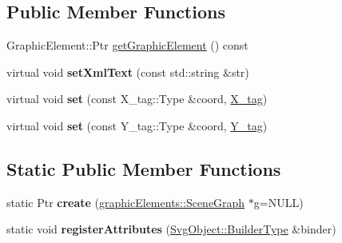 \subsection*{Public Member Functions}
\begin{DoxyCompactItemize}
\item 
GraphicElement::Ptr \hyperlink{classsambag_1_1disco_1_1svg_1_1_svg_text_aa1f3ca78615ca97b0c3883584104683b}{getGraphicElement} () const 
\item 
\hypertarget{classsambag_1_1disco_1_1svg_1_1_svg_text_a51de673f772b87db82987130a113acbf}{
virtual void {\bfseries setXmlText} (const std::string \&str)}
\label{classsambag_1_1disco_1_1svg_1_1_svg_text_a51de673f772b87db82987130a113acbf}

\item 
\hypertarget{classsambag_1_1disco_1_1svg_1_1_svg_text_a5b9a2141048f6ce528dde97ce93e77cb}{
virtual void {\bfseries set} (const X\_\-tag::Type \&coord, \hyperlink{structsambag_1_1disco_1_1svg_1_1_svg_text_1_1_x__tag}{X\_\-tag})}
\label{classsambag_1_1disco_1_1svg_1_1_svg_text_a5b9a2141048f6ce528dde97ce93e77cb}

\item 
\hypertarget{classsambag_1_1disco_1_1svg_1_1_svg_text_a4f3a085623991ebf973fefec6941a1f4}{
virtual void {\bfseries set} (const Y\_\-tag::Type \&coord, \hyperlink{structsambag_1_1disco_1_1svg_1_1_svg_text_1_1_y__tag}{Y\_\-tag})}
\label{classsambag_1_1disco_1_1svg_1_1_svg_text_a4f3a085623991ebf973fefec6941a1f4}

\end{DoxyCompactItemize}
\subsection*{Static Public Member Functions}
\begin{DoxyCompactItemize}
\item 
\hypertarget{classsambag_1_1disco_1_1svg_1_1_svg_text_a958a84cdc104eb71cbf4f2ddba3afe8b}{
static Ptr {\bfseries create} (\hyperlink{classsambag_1_1disco_1_1graphic_elements_1_1_scene_graph}{graphicElements::SceneGraph} $\ast$g=NULL)}
\label{classsambag_1_1disco_1_1svg_1_1_svg_text_a958a84cdc104eb71cbf4f2ddba3afe8b}

\item 
\hypertarget{classsambag_1_1disco_1_1svg_1_1_svg_text_af46f432db0e3e19de52b5f18058a21c2}{
static void {\bfseries registerAttributes} (\hyperlink{classsambag_1_1xml_1_1_x_m_l2_object}{SvgObject::BuilderType} \&binder)}
\label{classsambag_1_1disco_1_1svg_1_1_svg_text_af46f432db0e3e19de52b5f18058a21c2}

\end{DoxyCompactItemize}
